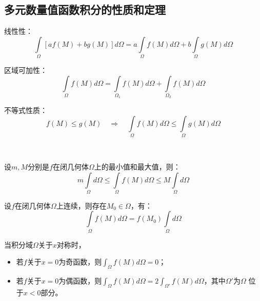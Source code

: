 \subsection{多元数量值函数积分的性质和定理}

线性性：
\[
\int\limits_{\varOmega}{\left[ af\left( M \right) +bg\left( M \right) \right] d\varOmega}=a\int\limits_{\varOmega}{f\left( M \right) d\varOmega}+b\int\limits_{\varOmega}{g\left( M \right) d\varOmega}
\]

区域可加性：
\[
\int\limits_{\varOmega}{f\left( M \right) d\varOmega}=\int\limits_{\varOmega _1}{f\left( M \right) d\varOmega}+\int\limits_{\varOmega _2}{f\left( M \right) d\varOmega}
\]

不等式性质：
\[
f\left( M \right) \leqslant g\left( M \right) \quad \Rightarrow \quad \int\limits_{\varOmega}{f\left( M \right) d\varOmega}\leqslant \int\limits_{\varOmega}{g\left( M \right) d\varOmega}
\]

~

\begin{theorem}[估值定理]
设$m,M$分别是$f$在闭几何体$\varOmega $上的最小值和最大值，则：
\[
m\int\limits_{\varOmega}{d\varOmega}\leqslant \int\limits_{\varOmega}{f\left( M \right) d\varOmega}\leqslant M\int\limits_{\varOmega}{d\varOmega}
\]
\end{theorem}

\begin{theorem}[积分中值定理]
设$f$在闭几何体$\varOmega $上连续，则存在$M_0\in \varOmega $，有：
\[
\int\limits_{\varOmega}{f\left( M \right) d\varOmega}=f\left( M_0 \right) \int\limits_{\varOmega}{d\varOmega}
\]
\end{theorem}

\begin{theorem}[对称性定理]
当积分域$\varOmega $关于$x$对称时，
\begin{itemize}
    \item 若$f$关于$x=0$为奇函数，则$\int_{\varOmega}{f\left( M \right) d\varOmega}=0$；
    \item 若$f$关于$x=0$为偶函数，则$\int_{\varOmega}{f\left( M \right) d\varOmega}=2\int_{\varOmega '}{f\left( M \right) d\varOmega}$，其中$\varOmega '$为$\varOmega $ 位于$x<0$部分。
\end{itemize}
\end{theorem}




